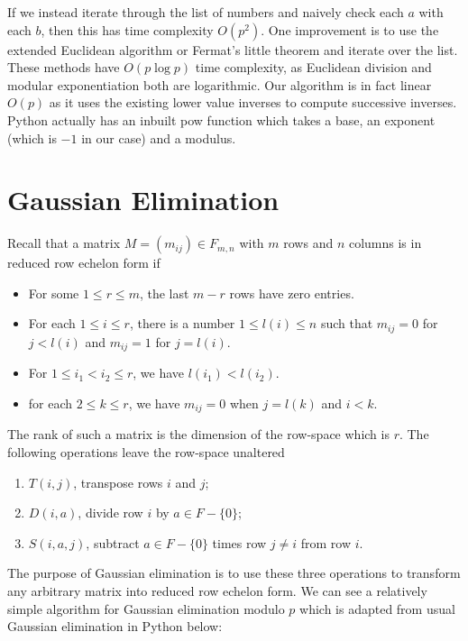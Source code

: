 \documentclass{article}
\begin{document}
If we instead iterate through the list of numbers and naively check each \(a\) with each \(b\), then this has time complexity \(O(p^2)\). One improvement is to use the extended Euclidean algorithm or Fermat's little theorem and iterate over the list. These methods have \(O(p\log{p})\) time complexity, as Euclidean division and modular exponentiation both are logarithmic. Our algorithm is in fact linear \(O(p)\) as it uses the existing lower value inverses to compute successive inverses. Python actually has an inbuilt pow function which takes a base, an exponent (which is \(-1\) in our case) and a modulus.

\section{Gaussian Elimination}

Recall that a matrix \(M = (m_{ij}) \in F_{m, n} \) with \(m\) rows and \(n\) columns is in reduced row echelon form if
\begin{itemize}
    \item For some \(1 \leq r \leq m\), the last \(m - r\) rows have zero entries.
    \item For each \(1 \leq i \leq r\), there is a number \(1 \leq l(i) \leq n\) such that \(m_{ij} = 0\) for \(j < l(i)\) and \(m_{ij} = 1\) for \(j = l(i)\).
    \item For \(1 \leq i_1 < i_2\leq r\), we have \(l(i_1) < l(i_2)\).
    \item for each \(2 \leq k \leq r\), we have \(m_{ij} = 0\) when \(j = l(k)\) and \(i < k\).
\end{itemize}
The rank of such a matrix is the dimension of the row-space which is \(r\). The following operations leave the row-space unaltered
\begin{enumerate}
    \item \(T(i,j)\), transpose rows \(i\) and \(j\);
    \item \(D(i, a)\), divide row \(i\) by \(a \in F- \{0\}\);
    \item \(S(i, a, j)\), subtract \(a \in F - \{0\}\) times row \(j \neq i\) from row \(i\).
\end{enumerate}
The purpose of Gaussian elimination is to use these three operations to transform any arbitrary matrix into reduced row echelon form. We can see a relatively simple algorithm for Gaussian elimination modulo \(p\) which is adapted from usual Gaussian elimination in Python below:
\end{document}
